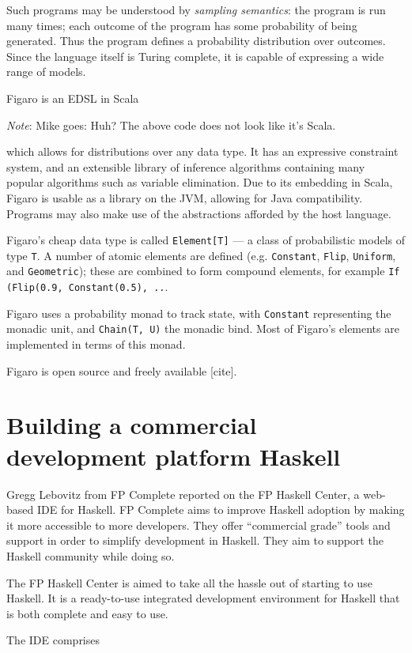 \documentclass{jfp1}
\newenvironment{ipar}[0]%
 {\begin{list}{}%
 {\setlength{\leftmargin}{1cm}}%
\item[]%
 }
 {\end{list}}
\newcommand\needcite{{\color{red} [cite]}\xspace}
\newcommand{\note}[1]{ \begin{ipar}  {\color{Gray} \textit{Note}: #1} \end{ipar}}
\begin{document}
Such programs may be understood by \textit{sampling semantics}:
the program is run many times; each outcome of the program has
some probability of being generated. Thus the program defines a
probability distribution over outcomes. Since the language itself is
Turing complete, it is capable of expressing a wide range of models.

Figaro is an EDSL in Scala \note{Mike goes: Huh?  The above code does
  not look like it's Scala.} which allows for distributions over any
data type. It has an expressive constraint system, and an extensible
library of inference algorithms containing many popular algorithms
such as variable elimination. Due to its embedding in Scala, Figaro
is usable as a library on the JVM, allowing for Java compatibility.
Programs may also make use of the abstractions afforded
by the host language.

Figaro's cheap data type is called \texttt{Element[T]} --- a class of
probabilistic models of type \texttt{T}. A number of atomic elements
are defined (e.g. \texttt{Constant}, \texttt{Flip}, \texttt{Uniform}, and
\texttt{Geometric}); these are combined to form compound elements, 
for example \texttt{If (Flip(0.9, Constant(0.5), ..}.

Figaro uses a probability monad to track state, with \texttt{Constant}
representing the monadic unit, and \texttt{Chain(T, U)} the monadic
bind. Most of Figaro's elements are implemented in terms of this monad.

Figaro is open source and freely available\needcite.

\section{Building a commercial development platform Haskell}


Gregg Lebovitz from FP Complete reported on the FP Haskell Center, 
a web-based IDE for Haskell.  FP Complete aims to improve Haskell
adoption by making it more accessible to more developers. They offer
``commercial grade'' tools and support in order to simplify development
in Haskell. They aim to support the Haskell community while doing so.

The FP Haskell Center is aimed to take all the hassle out of starting to
use Haskell. It is a ready-to-use integrated development environment
for Haskell that is both complete and easy to use.

The IDE comprises
\end{document}

